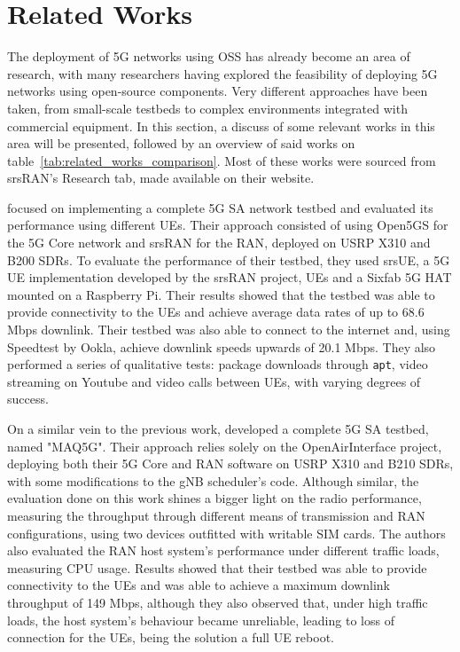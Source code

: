\section{Related Works}
\label{sec:related_works}
The deployment of 5G networks using \gls{OSS} has already become an area of research, with many researchers having explored the feasibility of deploying 5G networks using open-source components. Very different approaches have been taken, from small-scale testbeds to complex environments integrated with commercial equipment. In this section, a discuss of some relevant works in this area will be presented, followed by an overview of said works on table~\ref{tab:related_works_comparison}. Most of these works were sourced from srsRAN's Research tab, made available on their website.\bigskip

\textcite{tio2025exploring5g} focused on implementing a complete 5G \gls{SA} network testbed and evaluated its performance using different \glspl{UE}. Their approach consisted of using Open5GS for the 5G Core network and srsRAN for the \gls{RAN}, deployed on USRP X310 and B200 \glspl{SDR}. To evaluate the performance of their testbed, they used srsUE, a 5G \gls{UE} implementation developed by the srsRAN project,  \glspl{UE} and a Sixfab 5G HAT mounted on a Raspberry Pi.
Their results showed that the testbed was able to provide connectivity to the \glspl{UE} and achieve average data rates of up to 68.6 Mbps downlink. Their testbed was also able to connect to the internet and, using Speedtest by Ookla, achieve downlink speeds upwards of 20.1 Mbps. They also performed a series of qualitative tests: package downloads through \texttt{apt}, video streaming on Youtube and video calls between \glspl{UE}, with varying degrees of success.\bigskip

On a similar vein to the previous work, \textcite{vazquez2024maq5g} developed a complete 5G \gls{SA} testbed, named "MAQ5G". Their approach relies solely on the OpenAirInterface project, deploying both their 5G Core and \gls{RAN} software on USRP X310 and B210 \glspl{SDR}, with some modifications to the \gls{gNB} scheduler's code.
Although similar, the evaluation done on this work shines a bigger light on the radio performance, measuring the throughput through different means of transmission and \gls{RAN} configurations, using two  devices outfitted with writable SIM cards. The authors also evaluated the \gls{RAN} host system's performance under different traffic loads, measuring CPU usage.
Results showed that their testbed was able to provide connectivity to the \glspl{UE} and was able to achieve a maximum downlink throughput of 149 Mbps, although they also observed that, under high traffic loads, the host system's behaviour became unreliable, leading to loss of connection for the \glspl{UE}, being the solution a full \gls{UE} reboot.\bigskip

